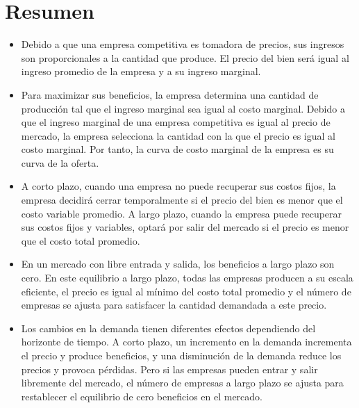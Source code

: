 \documentclass{article}
\begin{document}
\section{Resumen}
\begin{itemize}
    \item Debido a que una empresa competitiva es tomadora de precios, sus ingresos son proporcionales a la cantidad que produce. El precio del bien será igual al ingreso promedio de la empresa y a su ingreso marginal. 
    \item  Para maximizar sus beneficios, la empresa determina una cantidad de producción tal que el ingreso marginal sea igual al costo marginal. Debido a que el ingreso marginal de una empresa competitiva es igual al precio de mercado, la empresa selecciona la cantidad con la que el precio es igual al costo marginal. Por tanto, la curva de costo marginal de la empresa es su curva de la oferta. 
    \item  A corto plazo, cuando una empresa no puede recuperar sus costos fijos, la empresa decidirá cerrar temporalmente si el precio del bien es menor que el costo variable promedio. A largo plazo, cuando la empresa puede recuperar sus 
    costos fijos y variables, optará por salir del mercado si el precio es menor que el costo total promedio. 
    \item  En un mercado con libre entrada y salida, los beneficios a largo plazo son cero. En este equilibrio a largo plazo, todas las empresas producen a su escala eficiente, el precio es igual al mínimo del costo total promedio y el número de empresas se ajusta para satisfacer la cantidad demandada a este precio. 
    \item  Los cambios en la demanda tienen diferentes efectos dependiendo del horizonte de tiempo. A corto plazo, un incremento en la demanda incrementa el precio y produce beneficios, y una disminución de la demanda reduce los precios y provoca pérdidas. Pero si las empresas pueden entrar y salir libremente del mercado, el número de empresas a largo plazo se ajusta para restablecer el equilibrio de cero beneficios en el mercado.
\end{itemize}
\end{document}
